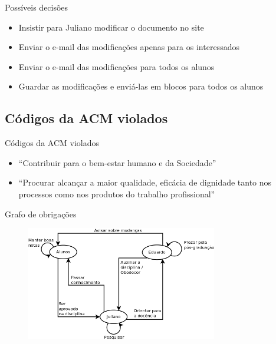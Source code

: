 \documentclass[dvipdfm]{beamer}
\begin{document}
\begin{frame}{Possíveis decisões}
	\begin{itemize}
		\item Insistir para Juliano modificar o documento no site
		\item Enviar o e-mail das modificações apenas para os interessados
		\item Enviar o e-mail das modificações para todos os alunos
		\item	Guardar as modificações e enviá-las em blocos para todos os alunos
	\end{itemize}
\end{frame}

\subsection{Códigos da ACM violados}
\begin{frame}{Códigos da ACM violados}
		\begin{itemize}
			\item ``Contribuir para o bem-estar humano e da Sociedade''\\
				
			\item ``Procurar alcançar a maior qualidade, eficácia de dignidade tanto nos processos como nos produtos do trabalho profissional''\\
				
				
		\end{itemize}
\end{frame}

\begin{frame}{Grafo de obrigações}
	\begin{figure}
		\includegraphics[height=5cm]{diagramas/grafo-de-obrigacoes.png}		
	\end{figure}
\end{frame}
\end{document}
